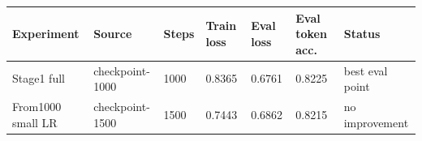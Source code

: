 \begin{tabular}{lllllll}
    \toprule
    Experiment        & Source          & Steps & Train loss & Eval loss & Eval token acc. & Status          \\
    \midrule
    Stage1 full       & checkpoint-1000 & 1000  & 0.8365     & 0.6761    & 0.8225          & best eval point \\
    From1000 small LR & checkpoint-1500 & 1500  & 0.7443     & 0.6862    & 0.8215          & no improvement      \\
    \bottomrule
\end{tabular}
